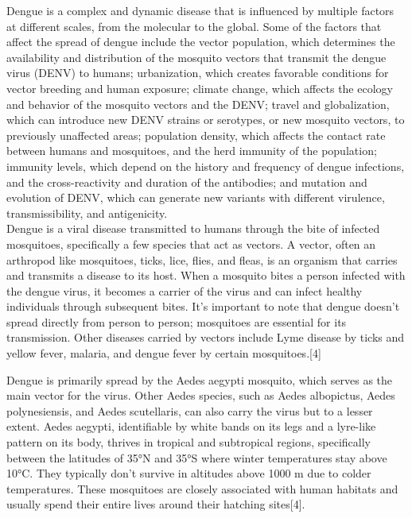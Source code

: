 \documentclass[conference]{IEEEtran}
\begin{document}
Dengue is a complex and dynamic disease that is influenced by multiple
factors at different scales, from the molecular to the global.
Some of the factors that affect the spread of dengue include the
vector population, which determines the availability and distribution
of the mosquito vectors that transmit the dengue virus (DENV) to humans;
urbanization, which creates favorable conditions for vector breeding and
human exposure; climate change, which affects the ecology and behavior of
the mosquito vectors and the DENV; travel and globalization, which can
introduce new DENV strains or serotypes, or new mosquito vectors, to
previously unaffected areas; population density, which affects the contact
rate between humans and mosquitoes, and the herd immunity of the population;
immunity levels, which depend on the history and frequency of dengue
infections, and the cross-reactivity and duration of the antibodies;
and mutation and evolution of DENV, which can generate new variants with
different virulence, transmissibility, and antigenicity. \\

Dengue is a viral disease transmitted to humans through the bite of infected
mosquitoes, specifically a few species that act as vectors. A vector,
often an arthropod like mosquitoes, ticks, lice, flies, and fleas,
is an organism that carries and transmits a disease to its host. When a mosquito bites a
person infected with the dengue virus, it becomes a carrier of the virus and can infect
healthy individuals through subsequent bites. It’s important to note that dengue doesn’t
spread directly from person to person; mosquitoes are essential for its transmission.
Other diseases carried by vectors include Lyme disease by ticks and yellow fever, malaria,
and dengue fever by certain mosquitoes.[4]

Dengue is primarily spread by the Aedes aegypti mosquito, which serves as the main vector
for the virus. Other Aedes species, such as Aedes albopictus, Aedes polynesiensis,
and Aedes scutellaris, can also carry the virus but to a lesser extent. Aedes aegypti,
identifiable by white bands on its legs and a lyre-like pattern on its body,
thrives in tropical and subtropical regions, specifically between the latitudes
of 35°N and 35°S where winter temperatures stay above 10°C. They typically don’t
survive in altitudes above 1000 m due to colder temperatures. These mosquitoes are
closely associated with human habitats and usually spend their entire lives around their
hatching sites[4].
\end{document}

